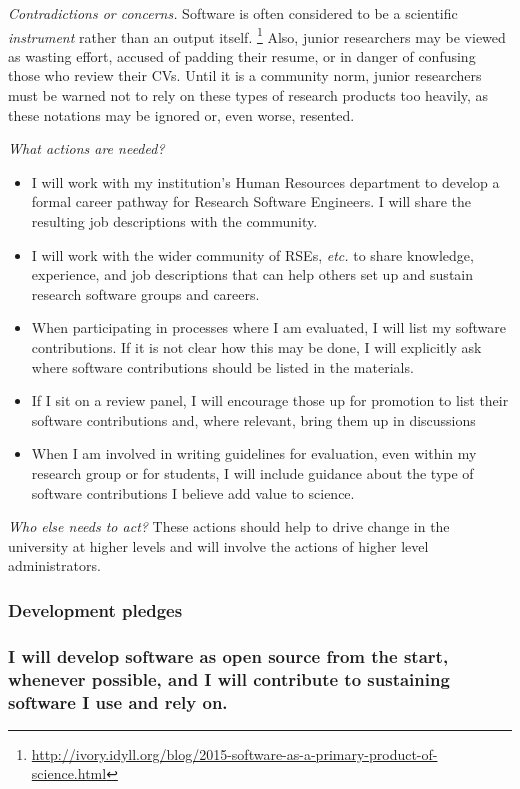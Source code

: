 \documentclass[a4paper,UKenglish]{dagman}
\renewcommand{\paragraph}[1]{\subsubsection*{#1}\xspace}
\newcommand{\etc}{\emph{etc.}\xspace}
\begin{document}
\emph{Contradictions or concerns.}
Software is often considered to be a scientific \emph{instrument} rather than an output itself.%
\footnote{\url{http://ivory.idyll.org/blog/2015-software-as-a-primary-product-of-science.html}}
Also, junior researchers may be viewed as wasting effort, accused of padding their resume, or in danger of confusing those who review their CVs. Until it is a community norm, junior researchers must be warned not to rely on these types of research products too heavily, as these notations may be ignored or, even worse, resented.


\emph{What actions are needed?}
\begin{itemize}
\item I will work with my institution's Human Resources department to develop a formal career pathway for Research Software Engineers. I will share the resulting job descriptions with the community.
\item I will work with the wider community of RSEs, \etc to share knowledge, experience, and job descriptions that can help others set up and sustain research software groups and careers.
\item When participating in processes where I am evaluated, I will list my software contributions.
If it is not clear how this may be done, I will explicitly ask where software contributions should be listed in the materials.
\item If I sit on a review panel, I will encourage those up for promotion to list their software contributions and, where relevant, bring them up in discussions
\item When I am involved in writing guidelines for evaluation, even within my research group or for students, I will include guidance about the type of software contributions I believe add value to science. 
\end{itemize}

\emph{Who else needs to act?}
These actions should help to drive change in the university at higher levels and will involve the actions of higher level administrators.

\subsubsection*{Development pledges}

\paragraph{I will develop software as open source from the start, whenever possible, and I will contribute to sustaining software I use and rely on.}
\end{document}
